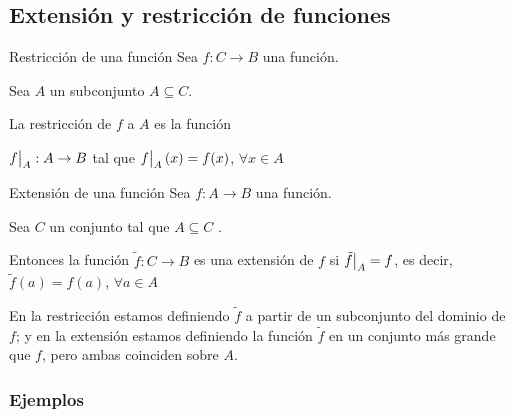 \subsection{Extensión y restricción de funciones}

\begin{definicion}{Restricción de una función}{}
    Sea $f: C \to B$ una función.

    Sea $A$ un subconjunto $A \subseteq C$.

    \medskip

    La restricción de $f$ a $A$ es la función 
    \begin{center}
        $\frest{f}{A}: A \to B$ tal que
        $\frest{f}{A} (x) = f(x)$, $\forall x \in A$
    \end{center}
\end{definicion}

\bigskip

\begin{definicion}{Extensión de una función}{}
    Sea $f: A \to B$ una función. 

    Sea $C$ un conjunto tal que
    $A \subseteq C$
    .

    \medskip
    
    Entonces la función $\tilde{f}: C \to B$ es una extensión de $f$ si 
    $\frest{\tilde{f}}{A} = f$, es decir, 
    $\tilde{f}(a) = f(a)$, $\forall a \in A$
\end{definicion}

En la restricción estamos definiendo $\tilde{f}$ a partir de un subconjunto del
dominio de $f$;
y en la extensión estamos definiendo la función $\tilde{f}$ en un conjunto más 
grande que $f$, pero ambas coinciden sobre $A$.

\subsubsection{Ejemplos}

